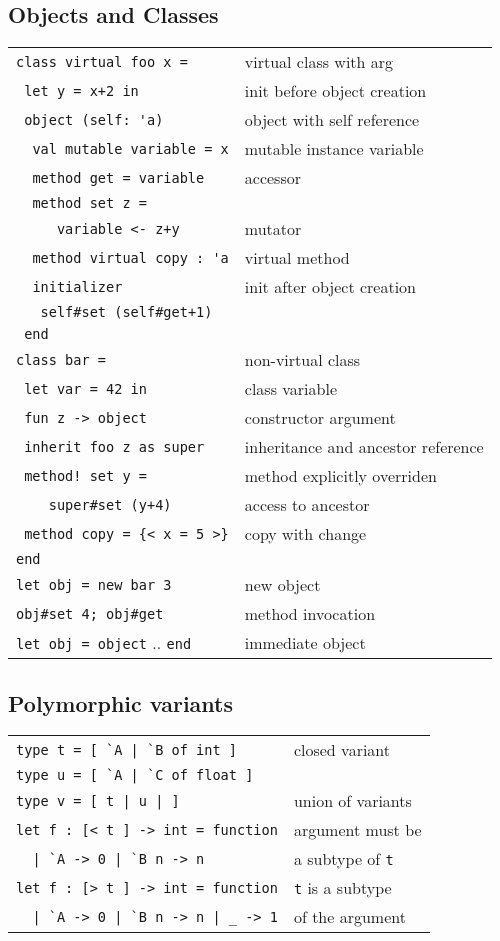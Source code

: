 \documentclass[10pt,landscape]{article}
\begin{document}
\begin{multicols}{3}
\subsection{Objects and Classes}

\begin{tabular}{ll}
\Verb!class virtual foo x = !& virtual class with arg \\
\Verb! let y = x+2 in! & init before object creation\\
\Verb! object (self: 'a)! & object with self reference\\
\Verb!  val mutable variable = x! & mutable instance variable \\
\Verb!  method get = variable! & accessor \\
\Verb!  method set z =!\\
\Verb!     variable <- z+y! & mutator\\
\Verb!  method virtual copy : 'a! & virtual method\\
\Verb!  initializer! & init after object creation\\
\Verb!   self#set (self#get+1)!& \\
\Verb! end! &  \\
\Verb!class bar = !&  non-virtual class\\
\Verb! let var = 42 in! & class variable\\
\Verb! fun z -> object! & constructor argument \\
\verb& inherit foo z as super& & inheritance and ancestor reference\\
\verb& method! set y =& & method explicitly overriden\\
\Verb!    super#set (y+4)! & access to ancestor \\
\Verb! method copy = {< x = 5 >}! & copy with change \\
\Verb!end! & \\
\Verb!let obj = new bar 3! & new object \\
\Verb!obj#set 4; obj#get!  & method invocation \\
\Verb!let obj = object! .. \Verb!end! & immediate object \
\end{tabular}

\subsection{Polymorphic variants}


\begin{tabular}{ll}
\Verb!type t = [ `A | `B of int ]! & closed variant \\
\Verb!type u = [ `A | `C of float ]! & \\
\Verb!type v = [ t | u | ]! & union of variants \\
\Verb!let f : [< t ] -> int = function! & argument must be\\
\Verb!  | `A -> 0 | `B n -> n! & \hfill a subtype of \Verb!t!\\
\Verb!let f : [> t ] -> int = function! & \Verb!t! is a subtype \\
\Verb!  | `A -> 0 | `B n -> n | _ -> 1! & \hfill of the argument \\
\end{tabular}

\end{multicols}
\end{document}
